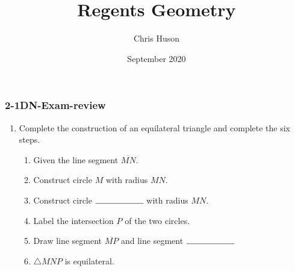 \documentclass[12pt, twoside]{article}
\title{Regents Geometry}
\author{Chris Huson}
\date{September 2020}
\begin{document}
\subsubsection*{2-1DN-Exam-review}
\begin{enumerate}
\item Complete the construction of an equilateral triangle and complete the six steps.
      \begin{enumerate}
        \item Given the line segment $\overline{MN}$.
        \bigskip
        \item Construct circle $M$ with radius $MN$.
        \bigskip
        \item Construct circle $\rule{2cm}{0.15mm}$  with radius $MN$. \bigskip
        \item Label the intersection $P$ of the two circles.
        \bigskip
        \item Draw line segment $\overline{MP}$ and line segment $\rule{2cm}{0.15mm}$
        \bigskip
        \item $\triangle MNP$ is equilateral.
      \end{enumerate}
      \vspace{7cm}
      \begin{center}
      \end{center}
\end{enumerate}
\end{document}
